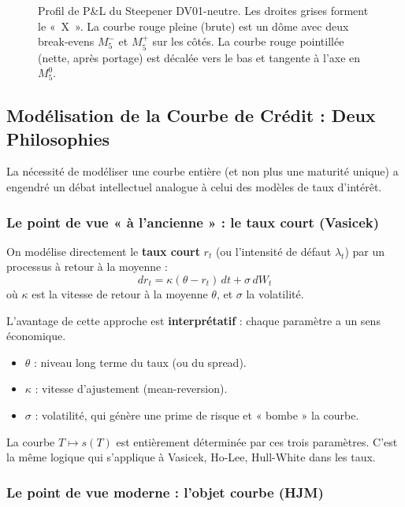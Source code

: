 \begin{figure}[htbp]
\begin{tikzpicture}[scale=1.15]
    \end{tikzpicture}
    \caption{Profil de P\&L du Steepener DV01-neutre. Les droites grises forment le «~X~». La courbe rouge pleine (brute) est un dôme avec deux break-evens $M_5^-$ et $M_5^+$ sur les côtés. La courbe rouge pointillée (nette, après portage) est décalée vers le bas et tangente à l'axe en $M_5^0$.}
    \label{fig:steepener_pl}
\end{figure}

\subsection{Modélisation de la Courbe de Crédit : Deux Philosophies}

La nécessité de modéliser une courbe entière (et non plus une maturité unique) a engendré un débat intellectuel analogue à celui des modèles de taux d'intérêt.

\subsubsection{Le point de vue « à l'ancienne » : le taux court (Vasicek)}

\begin{definition}
On modélise directement le \textbf{taux court} $r_t$ (ou l'intensité de défaut $\lambda_t$) par un processus à retour à la moyenne :
\[
dr_t = \kappa(\theta - r_t) \, dt + \sigma \, dW_t
\]
où $\kappa$ est la vitesse de retour à la moyenne $\theta$, et $\sigma$ la volatilité.
\end{definition}

L'avantage de cette approche est \textbf{interprétatif} : chaque paramètre a un sens économique.
\begin{itemize}
    \item $\theta$ : niveau long terme du taux (ou du spread).
    \item $\kappa$ : vitesse d'ajustement (mean-reversion).
    \item $\sigma$ : volatilité, qui génère une prime de risque et « bombe » la courbe.
\end{itemize}

La courbe $T \mapsto s(T)$ est entièrement déterminée par ces trois paramètres. C'est la même logique qui s'applique à Vasicek, Ho-Lee, Hull-White dans les taux.

\subsubsection{Le point de vue moderne : l'objet courbe (HJM)}

